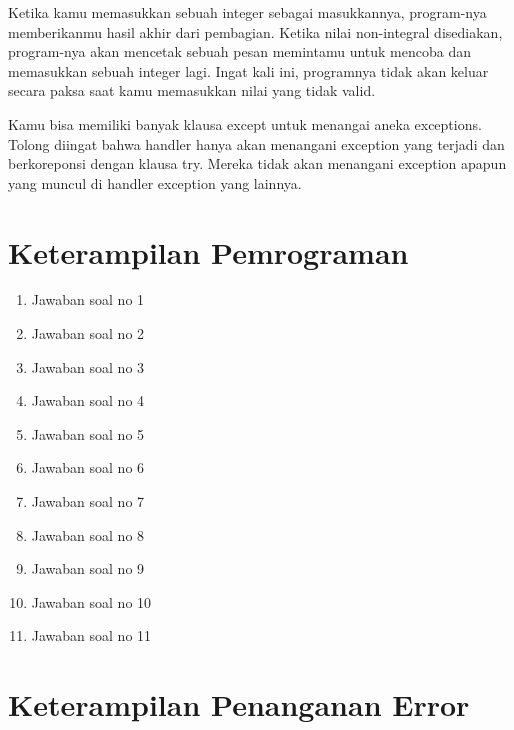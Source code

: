 Ketika kamu memasukkan sebuah integer sebagai masukkannya, program-nya memberikanmu hasil akhir dari pembagian. Ketika nilai non-integral disediakan, program-nya akan mencetak sebuah pesan memintamu untuk mencoba dan memasukkan sebuah integer lagi. Ingat kali ini, programnya tidak akan keluar secara paksa saat kamu memasukkan nilai yang tidak valid.

Kamu bisa memiliki banyak klausa except untuk menangai aneka exceptions. Tolong diingat bahwa handler hanya akan menangani exception yang terjadi dan berkoreponsi dengan klausa try. Mereka tidak akan menangani exception apapun yang muncul di handler exception yang lainnya.

\part{Keterampilan Pemrograman}
\begin{enumerate}
	\item Jawaban soal no 1
    
    \item Jawaban soal no 2
    
    \item Jawaban soal no 3
    
    \item Jawaban soal no 4
    
    \item Jawaban soal no 5
    
    \item Jawaban soal no 6
    
    \item Jawaban soal no 7
    
    \item Jawaban soal no 8
    
    \item Jawaban soal no 9
    
    \item Jawaban soal no 10
    
    \item Jawaban soal no 11
    
\end{enumerate}

\part{Keterampilan Penanganan Error}



